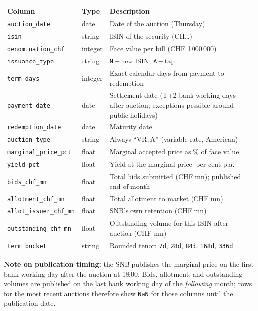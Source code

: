 \documentclass[12pt,a4paper]{article}
\begin{document}
\begin{center}
\begin{tabular}{L{3.8cm} L{2.5cm} L{7.5cm}}
  \toprule
  \textbf{Column} & \textbf{Type} & \textbf{Description} \\
  \midrule
  \texttt{auction\_date}         & date    & Date of the auction (Thursday) \\
  \texttt{isin}                  & string  & ISIN of the security (CH\ldots) \\
  \texttt{denomination\_chf}     & integer & Face value per bill (CHF 1\,000\,000) \\
  \texttt{issuance\_type}        & string  & \texttt{N}\,=\,new ISIN; \texttt{A}\,=\,tap \\
  \texttt{term\_days}            & integer & Exact calendar days from payment to redemption \\
  \texttt{payment\_date}         & date    & Settlement date (T+2 bank working
                                             days after auction; exceptions
                                             possible around public holidays) \\
  \texttt{redemption\_date}      & date    & Maturity date \\
  \texttt{auction\_type}         & string  & Always ``VR,\,A'' (variable rate, American) \\
  \texttt{marginal\_price\_pct}  & float   & Marginal accepted price as \% of face value \\
  \texttt{yield\_pct}            & float   & Yield at the marginal price, per cent p.a. \\
  \texttt{bids\_chf\_mn}         & float   & Total bids submitted (CHF mn); published end of month \\
  \texttt{allotment\_chf\_mn}    & float   & Total allotment to market (CHF mn) \\
  \texttt{allot\_issuer\_chf\_mn}& float   & SNB's own retention (CHF mn) \\
  \texttt{outstanding\_chf\_mn}  & float   & Outstanding volume for this ISIN after auction (CHF mn) \\
  \texttt{term\_bucket}          & string  & Rounded tenor: \texttt{7d}, \texttt{28d},
                                             \texttt{84d}, \texttt{168d}, \texttt{336d} \\
  \bottomrule
\end{tabular}
\end{center}

\noindent\textbf{Note on publication timing:} the SNB publishes the marginal price
on the first bank working day after the auction at 18:00.  Bids, allotment, and
outstanding volumes are published on the last bank working day of the
\emph{following} month; rows for the most recent auctions therefore show
\texttt{NaN} for those columns until the publication date.
\end{document}
